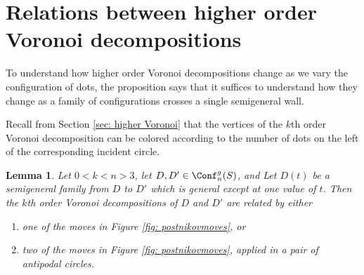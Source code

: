 \documentclass[11pt,oneside]{amsart}
\newtheorem{lemma}[thm]{Lemma}
\theoremstyle{definition}
\theoremstyle{remark}
\numberwithin{equation}{section}
\begin{document}
\section{Relations between higher order Voronoi decompositions}\label{sec: Relations}

To understand how higher order Voronoi decompositions change as we vary the configuration of dots, the proposition says that it suffices to understand how they change as a family of configurations crosses a single semigeneral wall. 

Recall from Section \ref{sec: higher Voronoi} that the vertices of the $k$th order Voronoi decomposition can be colored according to the number of dots on the left of the corresponding incident circle. %

\begin{lemma}\label{lemma: move}
Let $0<k<n>3$, let $D,D'\in \Conf^g_n(S)$, and 
Let $D(t)$ be a semigeneral family from $D$ to $D'$ which is general except at one value of $t$. Then the $k$th order Voronoi decompositions of $D$ and $D'$ are related by either
\begin{enumerate}
    \item one of the moves in Figure \ref{fig: postnikovmoves}, or
    \item two of the moves in Figure \ref{fig: postnikovmoves}, applied in a pair of antipodal circles.
\end{enumerate}




\end{lemma}
\end{document}
